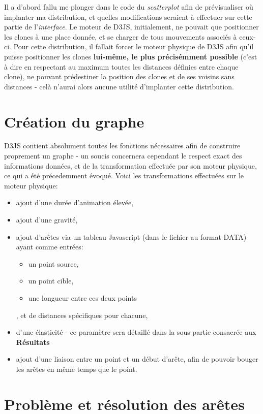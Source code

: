 \documentclass[pdftex,12pt,a4paper]{report}
\begin{document}
\begin{spacing}{1.2}
Il a d'abord fallu me plonger dans le code du \textit{scatterplot} afin de prévisualiser où implanter ma distribution, et quelles modifications seraient à effectuer sur cette partie de l'\textit{interface}. Le moteur de D3JS, initialement, ne pouvait que positionner les clones à une place donnée, et se charger de tous mouvements associés à ceux-ci. Pour cette distribution, il fallait forcer le moteur physique de D3JS afin qu'il puisse positionner les clones \textbf{lui-même, le plus précisémment possible} (c'est à dire en respectant au maximum toutes les distances définies entre chaque clone), ne pouvant prédestiner la position des clones et de ses voisins sans distances - celà n'aurai alors aucune utilité d'implanter cette distribution.

\section{Création du graphe}

D3JS contient absolument toutes les fonctions nécessaires afin de construire proprement un graphe - un soucis concernera cependant le respect exact des informations données, et de la transformation effectuée par son moteur physique, ce qui a été précedemment évoqué.
\newline
Voici les transformations effectuées sur le moteur physique:
\begin{itemize}
\item{ajout d'une durée d'animation élevée,}
\item{ajout d'une gravité,}
\item{ajout d'arêtes via un tableau Javascript (dans le fichier au format DATA) ayant comme entrées:	
\begin{itemize}
\item{un point source,}
\item{un point cible,}
\item{une longueur entre ces deux points}
\end{itemize}
, et de distances spécifiques pour chacune,}
\item{d'une élasticité - ce paramètre sera détaillé dans la sous-partie consacrée aux \textbf{Résultats}}
\item{ajout d'une liaison entre un point et un début d'arête, afin de pouvoir bouger les arêtes en même temps que le point.}
\end{itemize}

\section{Problème et résolution des arêtes}


\end{spacing}
\end{document}
